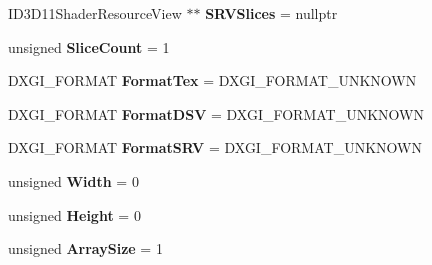 \begin{DoxyCompactItemize}
\item 
I\+D3\+D11\+Shader\+Resource\+View $\ast$$\ast$ {\bfseries S\+R\+V\+Slices} = nullptr\hypertarget{struct_ensum_1_1_graphics_1_1_depth_buffer_a58d957a868984e88f907295381c8a765}{}\label{struct_ensum_1_1_graphics_1_1_depth_buffer_a58d957a868984e88f907295381c8a765}

\item 
unsigned {\bfseries Slice\+Count} = 1\hypertarget{struct_ensum_1_1_graphics_1_1_depth_buffer_a01031a04589167914241edce0ff6b789}{}\label{struct_ensum_1_1_graphics_1_1_depth_buffer_a01031a04589167914241edce0ff6b789}

\item 
D\+X\+G\+I\+\_\+\+F\+O\+R\+M\+AT {\bfseries Format\+Tex} = D\+X\+G\+I\+\_\+\+F\+O\+R\+M\+A\+T\+\_\+\+U\+N\+K\+N\+O\+WN\hypertarget{struct_ensum_1_1_graphics_1_1_depth_buffer_a9a6f1b6a7b51a76d5337a66c3a47d35f}{}\label{struct_ensum_1_1_graphics_1_1_depth_buffer_a9a6f1b6a7b51a76d5337a66c3a47d35f}

\item 
D\+X\+G\+I\+\_\+\+F\+O\+R\+M\+AT {\bfseries Format\+D\+SV} = D\+X\+G\+I\+\_\+\+F\+O\+R\+M\+A\+T\+\_\+\+U\+N\+K\+N\+O\+WN\hypertarget{struct_ensum_1_1_graphics_1_1_depth_buffer_ac5d3bfd41369491752b31837fdd35f5d}{}\label{struct_ensum_1_1_graphics_1_1_depth_buffer_ac5d3bfd41369491752b31837fdd35f5d}

\item 
D\+X\+G\+I\+\_\+\+F\+O\+R\+M\+AT {\bfseries Format\+S\+RV} = D\+X\+G\+I\+\_\+\+F\+O\+R\+M\+A\+T\+\_\+\+U\+N\+K\+N\+O\+WN\hypertarget{struct_ensum_1_1_graphics_1_1_depth_buffer_a1aa719dc13932e0369bac8d9d173378b}{}\label{struct_ensum_1_1_graphics_1_1_depth_buffer_a1aa719dc13932e0369bac8d9d173378b}

\item 
unsigned {\bfseries Width} = 0\hypertarget{struct_ensum_1_1_graphics_1_1_depth_buffer_ad14c64afb64df36540822bc7a433df94}{}\label{struct_ensum_1_1_graphics_1_1_depth_buffer_ad14c64afb64df36540822bc7a433df94}

\item 
unsigned {\bfseries Height} = 0\hypertarget{struct_ensum_1_1_graphics_1_1_depth_buffer_af2a5169f76b3d27442051d34d69212db}{}\label{struct_ensum_1_1_graphics_1_1_depth_buffer_af2a5169f76b3d27442051d34d69212db}

\item 
unsigned {\bfseries Array\+Size} = 1\hypertarget{struct_ensum_1_1_graphics_1_1_depth_buffer_a3e39d22a9b572cf5156b06fbdc439c93}{}\label{struct_ensum_1_1_graphics_1_1_depth_buffer_a3e39d22a9b572cf5156b06fbdc439c93}


\end{DoxyCompactItemize}
